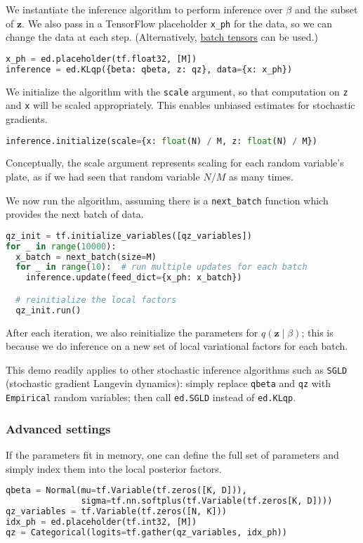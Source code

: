 We instantiate the inference algorithm to perform inference over
$\beta$ and the subset of $\mathbf{z}$.
We also pass in a TensorFlow placeholder \texttt{x_ph} for the data,
so we can change the data at each step. (Alternatively,
\href{/api/data}{batch tensors} can be used.)
\begin{lstlisting}[language=Python]
x_ph = ed.placeholder(tf.float32, [M])
inference = ed.KLqp({beta: qbeta, z: qz}, data={x: x_ph})
\end{lstlisting}
We initialize the algorithm with the \texttt{scale} argument, so that
computation on \texttt{z} and \texttt{x} will be scaled appropriately.
This enables unbiased estimates for stochastic gradients.
\begin{lstlisting}[language=Python]
inference.initialize(scale={x: float(N) / M, z: float(N) / M})
\end{lstlisting}
Conceptually, the scale argument represents scaling for each random
variable’s plate, as if we had seen that random variable $N/M$ as many
times.

We now run the algorithm, assuming there is a \texttt{next_batch}
function which provides the next batch of data.
\begin{lstlisting}[language=Python]
qz_init = tf.initialize_variables([qz_variables])
for _ in range(10000):
  x_batch = next_batch(size=M)
  for _ in range(10):  # run multiple updates for each batch
    inference.update(feed_dict={x_ph: x_batch})

  # reinitialize the local factors
  qz_init.run()
\end{lstlisting}
After each iteration, we also reinitialize the parameters for
$q(\mathbf{z}\mid\beta)$; this is because we do inference on a new
set of local variational factors for each batch.

This demo readily applies to other stochastic inference
algorithms such as \texttt{SGLD} (stochastic gradient Langevin
dynamics): simply
replace \texttt{qbeta} and \texttt{qz} with \texttt{Empirical} random
variables; then call \texttt{ed.SGLD} instead of \texttt{ed.KLqp}.

\subsubsection{Advanced settings}

If the parameters fit in memory, one can define the full set of
parameters and simply index them into the local posterior factors.

\begin{lstlisting}[language=Python]
qbeta = Normal(mu=tf.Variable(tf.zeros([K, D])),
               sigma=tf.nn.softplus(tf.Variable(tf.zeros[K, D])))
qz_variables = tf.Variable(tf.zeros([N, K]))
idx_ph = ed.placeholder(tf.int32, [M])
qz = Categorical(logits=tf.gather(qz_variables, idx_ph))
\end{lstlisting}


